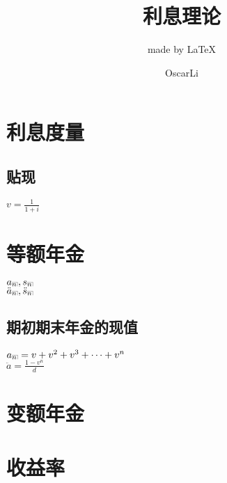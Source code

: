 \documentclass[cn,11pt,chinese,black]{elegantbook}
\title{利息理论}
\subtitle{made by \LaTeX{} }
\author{OscarLi}
\institute{西南交大数学学院}
\begin{document}
\def\angles#1{{%
		\vbox{\hrule height .2pt
			\kern 1pt
			\hbox{$\scriptstyle {#1}\kern 1pt$}%
		}\kern-.05pt \vrule width .2pt
}}
%
\maketitle
	\chapter{利息度量}
	
	\section{贴现}
	$v=\frac{1}{1+i}$
	\chapter{等额年金}
	\noindent$a_{\angles{n}},s_{\angles{n}}$\\	$\ddot{a}_{\angles{n}},\ddot{s}_{\angles{n}}$
	\section{期初期末年金的现值}
	$a_{\angles{n}}=v+v^2+v^3+\dots+v^n$
\\ $\ddot{a}=\frac{1-v^n}{d}$
\chapter{变额年金}

\chapter{收益率}
\end{document}
